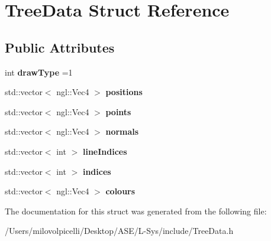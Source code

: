 \hypertarget{struct_tree_data}{}\section{Tree\+Data Struct Reference}
\label{struct_tree_data}
\subsection*{Public Attributes}
\begin{DoxyCompactItemize}
\item 
\mbox{\label{struct_tree_data_a1fd9b4f1884a92f36b7e6e1eab7427dd}} 
int {\bfseries draw\+Type} =1
\item 
\mbox{\label{struct_tree_data_a593687216efa0f1351c97292e795172a}} 
std\+::vector$<$ ngl\+::\+Vec4 $>$ {\bfseries positions}
\item 
\mbox{\label{struct_tree_data_aadfd3bf0de1bf32e5bf111ca9957060d}} 
std\+::vector$<$ ngl\+::\+Vec4 $>$ {\bfseries points}
\item 
\mbox{\label{struct_tree_data_aa6f9ab8331574ee97e7e35a687544c70}} 
std\+::vector$<$ ngl\+::\+Vec4 $>$ {\bfseries normals}
\item 
\mbox{\label{struct_tree_data_a1c8e506ebeff82c33ffe00d6b441d065}} 
std\+::vector$<$ int $>$ {\bfseries line\+Indices}
\item 
\mbox{\label{struct_tree_data_ada3057bd649586c16142a5217cfddbed}} 
std\+::vector$<$ int $>$ {\bfseries indices}
\item 
\mbox{\label{struct_tree_data_aa7f196c3eb10f48d36472ed53004800d}} 
std\+::vector$<$ ngl\+::\+Vec4 $>$ {\bfseries colours}
\end{DoxyCompactItemize}


The documentation for this struct was generated from the following file\+:\begin{DoxyCompactItemize}
\item 
/\+Users/milovolpicelli/\+Desktop/\+A\+S\+E/\+L-\/\+Sys/include/Tree\+Data.\+h\end{DoxyCompactItemize}
